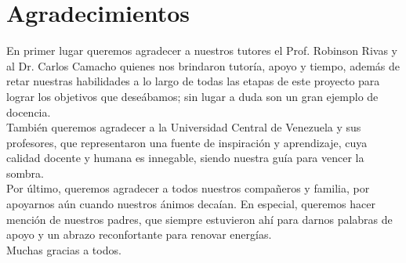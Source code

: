 \chapter{Agradecimientos}

En primer lugar queremos agradecer a nuestros tutores el Prof. Robinson Rivas y al Dr. Carlos Camacho quienes nos brindaron tutoría, apoyo y tiempo, además de retar nuestras habilidades a lo largo de todas las etapas de este proyecto para lograr los objetivos que deseábamos; sin lugar a duda son un gran ejemplo de docencia.\\

También queremos agradecer a la Universidad Central de Venezuela y sus profesores, que representaron una fuente de inspiración y aprendizaje, cuya calidad docente y humana es innegable, siendo nuestra guía para vencer la sombra.\\

Por último, queremos agradecer a todos nuestros compañeros y familia, por apoyarnos aún cuando nuestros ánimos decaían. En especial, queremos hacer mención de nuestros padres, que siempre estuvieron ahí para darnos palabras de apoyo y un abrazo reconfortante para renovar energías.\\

Muchas gracias a todos.\\

